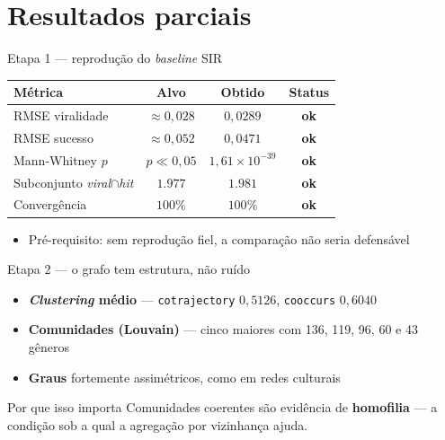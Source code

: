 \documentclass[aspectratio=169]{beamer}
\newcommand{\dest}[1]{\textcolor{ufprB}{\textbf{#1}}}
\newcommand{\azul}[1]{\textcolor{ufprA}{\textbf{#1}}}
\newcommand{\verd}[1]{\textcolor{ufprC}{\textbf{#1}}}
\begin{document}
\section{Resultados parciais}

\begin{frame}{Etapa 1 --- reprodução do \emph{baseline} SIR}
  \begin{center}
  \begin{tabular}{lccc}
  \toprule
  \textbf{Métrica} & \textbf{Alvo} & \textbf{Obtido} & \textbf{Status} \\
  \midrule
  RMSE viralidade            & $\approx 0{,}028$ & $0{,}0289$ & \verd{ok} \\
  RMSE sucesso               & $\approx 0{,}052$ & $0{,}0471$ & \verd{ok} \\
  Mann-Whitney $p$           & $p \ll 0{,}05$    & $1{,}61\times10^{-39}$ & \verd{ok} \\
  Subconjunto \emph{viral}$\cap$\emph{hit} & $1.977$ & $1.981$ & \verd{ok} \\
  Convergência               & $100\%$           & $100\%$ & \verd{ok} \\
  \bottomrule
  \end{tabular}
  \end{center}
  \vfill
  \begin{itemize}
    \item Pré-requisito: sem reprodução fiel, a comparação não seria defensável
  \end{itemize}
  \vfill
\end{frame}

\begin{frame}{Etapa 2 --- o grafo tem estrutura, não ruído}
  \vfill
  \begin{itemize}
    \item \azul{\emph{Clustering} médio} --- \texttt{cotrajectory} $0{,}5126$, \texttt{cooccurs} $0{,}6040$
    \item \azul{Comunidades (Louvain)} --- cinco maiores com 136, 119, 96, 60 e 43 gêneros
    \item \azul{Graus} fortemente assimétricos, como em redes culturais
  \end{itemize}
  \vfill
  \begin{block}{Por que isso importa}
    Comunidades coerentes são evidência de \dest{homofilia} --- a condição sob a qual a agregação
    por vizinhança ajuda.
  \end{block}
  \vfill
\end{frame}
\end{document}
